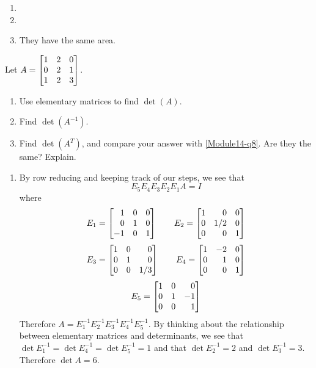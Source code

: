 \begin{exercises}
\begin{problist}
\begin{solution}
\begin{enumerate}
				\item

				\item

				\item They have the same area.
			\end{enumerate}
		\end{solution}

		\prob Let $A=\mat{1&2&0\\0&2&1\\1&2&3}$.
		\begin{enumerate}
			\item \label{Module14-q8} Use elementary matrices to find $\det(A)$.

			\item Find $\det(A^{-1})$.

			\item Find $\det(A^{T})$, and compare your answer with
				\ref{Module14-q8}. Are they the same? Explain.
		\end{enumerate}
		\begin{solution}
			\begin{enumerate}
				\item By row reducing and keeping track
					of our steps, we see that
					\[
						E_5E_4E_3E_2E_1 A = I
					\]
					where
					\[
						E_{1} =
						\mat{
							1  & 0 & 0 \\
							0  & 1 & 0 \\
							-1 & 0 & 1
						}\qquad
						E_{2} =
						\mat{
							1  & 0 & 0 \\
							0  & 1/2 & 0 \\
							0 & 0 & 1
						}
					\]
					\[
						E_{3} =
						\mat{
							1  & 0 & 0 \\
							0  & 1 & 0 \\
							0 & 0 & 1/3
						}\qquad
						E_{4} =
						\mat{
							1  & -2 & 0 \\
							0  & 1 & 0 \\
							0 & 0 & 1
						}
					\]
					\[
						E_{5} =
						\mat{
							1  & 0 & 0 \\
							0  & 1 & -1 \\
							0 & 0 & 1
						}
					\]
					Therefore $A=E_1^{-1}E_2^{-1}E_3^{-1}E_4^{-1}E_5^{-1}$.
					By thinking about the relationship between elementary
					matrices and determinants, we see that $\det E_1^{-1}
					=\det E_4^{-1} =\det E_5^{-1} = 1$ and
					that $\det E_2^{-1} = 2$ and $\det E_3^{-1} = 3$.
					Therefore $\det A = 6$.


\end{enumerate}
\end{solution}
\end{problist}
\end{exercises}
